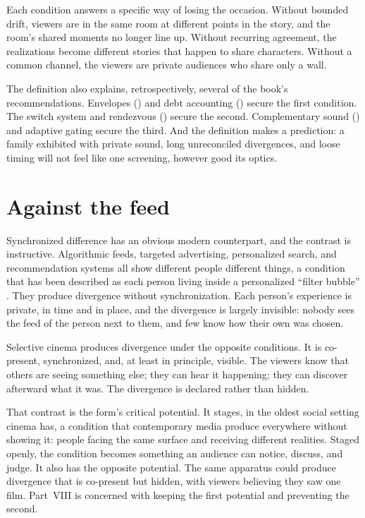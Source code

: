 Each condition answers a specific way of losing the occasion. Without bounded drift, viewers are in the same room at different points in the story, and the room's shared moments no longer line up. Without recurring agreement, the realizations become different stories that happen to share characters. Without a common channel, the viewers are private audiences who share only a wall.

The definition also explains, retrospectively, several of the book's recommendations. Envelopes () and debt accounting () secure the first condition. The switch system and rendezvous () secure the second. Complementary sound () and adaptive gating secure the third. And the definition makes a prediction: a family exhibited with private sound, long unreconciled divergences, and loose timing will not feel like one screening, however good its optics.

\section{Against the feed}

Synchronized difference has an obvious modern counterpart, and the contrast is instructive. Algorithmic feeds, targeted advertising, personalized search, and recommendation systems all show different people different things, a condition that has been described as each person living inside a personalized ``filter bubble'' \cite{pariser}. They produce divergence without synchronization. Each person's experience is private, in time and in place, and the divergence is largely invisible: nobody sees the feed of the person next to them, and few know how their own was chosen.

Selective cinema produces divergence under the opposite conditions. It is co-present, synchronized, and, at least in principle, visible. The viewers know that others are seeing something else; they can hear it happening; they can discover afterward what it was. The divergence is declared rather than hidden.

That contrast is the form's critical potential. It stages, in the oldest social setting cinema has, a condition that contemporary media produce everywhere without showing it: people facing the same surface and receiving different realities. Staged openly, the condition becomes something an audience can notice, discuss, and judge. It also has the opposite potential. The same apparatus could produce divergence that is co-present but hidden, with viewers believing they saw one film. Part~VIII is concerned with keeping the first potential and preventing the second.

